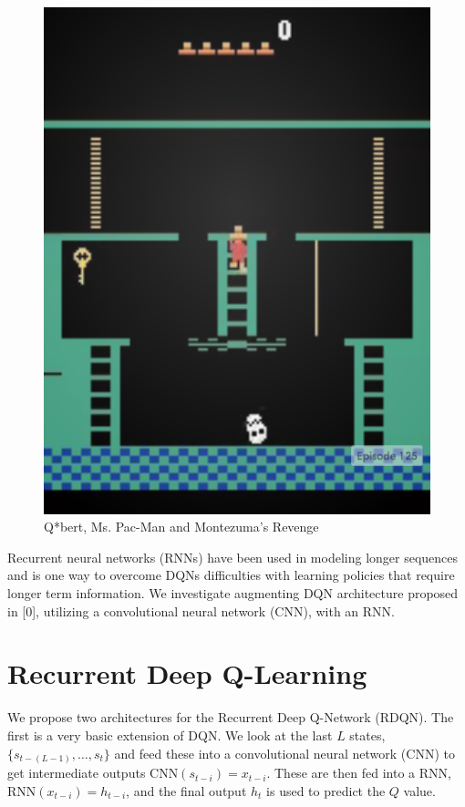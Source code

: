 \documentclass{article}
\begin{document}
\begin{figure}[h]
\begin{minipage}{0.8\textwidth}
            \centering
            \includegraphics[scale=0.15]{MontezumaRevenge}
        \end{minipage}
        \caption{Q*bert, Ms. Pac-Man and Montezuma's Revenge}
    \end{figure}
    
    Recurrent neural networks (RNNs) have been used in modeling longer sequences and
    is one way to overcome DQNs difficulties with learning policies that require longer
    term information. We investigate augmenting DQN architecture proposed in [0], utilizing
    a convolutional neural network (CNN), with an RNN.

\section{Recurrent Deep Q-Learning}
We propose two architectures for the Recurrent Deep Q-Network (RDQN). The first
is a very basic extension of DQN. We look at the last $L$ states, $\{s_{t-(L-1)},
\dots, s_{t}\}$ and feed these into a convolutional neural network (CNN) to get
intermediate outputs $\text{CNN}(s_{t-i}) = x_{t-i}$. These are then fed into a
RNN, $\text{RNN}(x_{t-i}) = h_{t-i}$, and the final output $h_t$ is used to
predict the $Q$ value.
\end{document}

